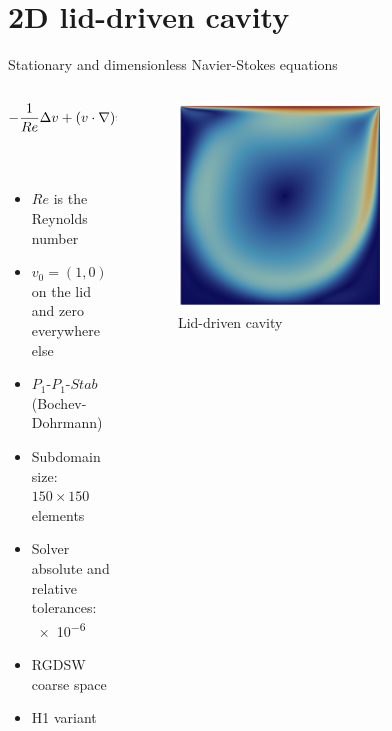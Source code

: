 \section{2D lid-driven cavity}

\begin{frame}{Stationary and dimensionless Navier-Stokes equations}
  \vspace{-1em}
	\begin{columns}
		\begin{column}{0.6\textwidth}%
			\begin{align*}
				-\frac{1}{Re} \Delta v + (v \cdot \nabla)v + \nabla p & = 0 \;   & {\rm in}\; \Omega           \\
				{\rm div}(v)                                          & = 0 \;   & {\rm in} \; \Omega          \\
				v                                                     & = v_0 \; & {\rm on} \; \partial \Omega
			\end{align*}
			\begin{itemize}
				\item $Re$ is the Reynolds number
				\item $v_0=(1,0)$ on the lid and zero everywhere else
				\item $P_1\textrm{-}P_1\textrm{-}Stab$ (Bochev-Dohrmann)
				\item Subdomain size: $150\times 150$ elements
				\item Solver absolute and relative tolerances: \num{e-6}
				\item RGDSW coarse space
				\item H1 variant
			\end{itemize}
		\end{column}
		\begin{column}{0.4\textwidth}
			\begin{figure}
				\centering
				\includegraphics[width=0.7\textwidth]{images/ldc.png}
				\caption{Lid-driven cavity}
			\end{figure}
		\end{column}
	\end{columns}
\end{frame}

